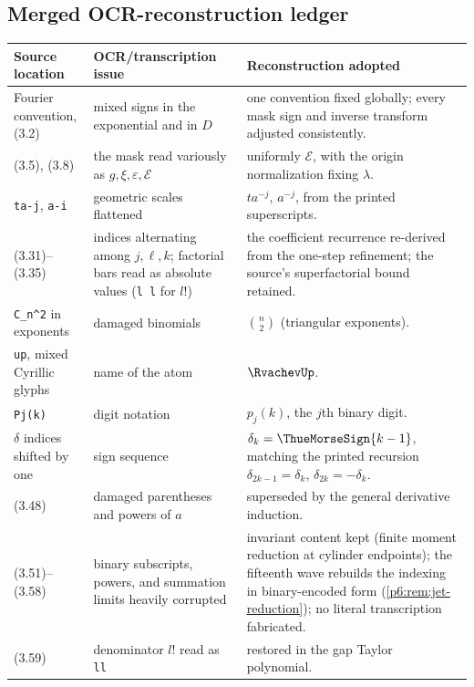 \documentclass[11pt,oneside]{article}
\numberwithin{equation}{section}
\theoremstyle{definition}
\theoremstyle{remark}
\begin{document}
\subsection*{Merged OCR-reconstruction ledger}

\begin{longtable}{@{}p{}p{}p{}@{}}
\toprule
Source location & OCR/transcription issue & Reconstruction adopted \\
\midrule
\endhead
Fourier convention, (3.2) & mixed signs in the exponential and in $D$ &
one convention fixed globally; every mask sign and inverse transform
adjusted consistently.\\
(3.5), (3.8) & the mask read variously as $g,\xi,\varepsilon,\mathcal E$ &
uniformly $\mathcal E$, with the origin normalization fixing $\lambda$.\\
\texttt{ta-j}, \texttt{a-i} & geometric scales flattened & $ta^{-j}$,
$a^{-j}$, from the printed superscripts.\\
(3.31)--(3.35) & indices alternating among $j,\ell,k$; factorial bars read
as absolute values (\texttt{l l} for $l!$) & the coefficient recurrence
re-derived from the one-step refinement; the source's superfactorial bound
retained.\\
\texttt{C\_n\textasciicircum2} in exponents & damaged binomials &
$\binom n2$ (triangular exponents).\\
\texttt{up}, mixed Cyrillic glyphs & name of the atom & $\RvachevUp$.\\
\texttt{Pj(k)} & digit notation & $p_j(k)$, the $j$th binary digit.\\
$\delta$ indices shifted by one & sign sequence &
$\delta_k=\ThueMorseSign{k-1}$, matching the printed recursion
$\delta_{2k-1}=\delta_k$, $\delta_{2k}=-\delta_k$.\\
(3.48) & damaged parentheses and powers of $a$ & superseded by the general
derivative induction.\\
(3.51)--(3.58) & binary subscripts, powers, and summation limits heavily
corrupted & invariant content kept (finite moment reduction at cylinder
endpoints); the fifteenth wave rebuilds the indexing in binary-encoded
form (\cref{p6:rem:jet-reduction}); no literal transcription fabricated.\\
(3.59) & denominator $l!$ read as \texttt{ll} & restored in the gap Taylor
polynomial.\\

\end{longtable}
\end{document}
